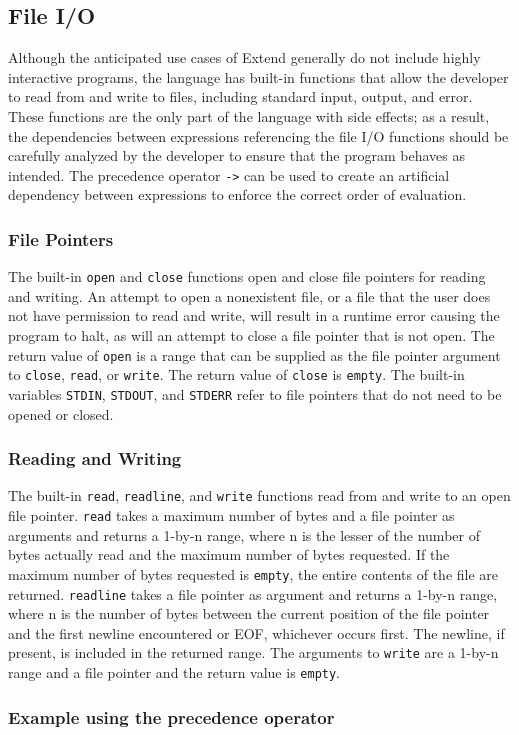 \subsection{File I/O}
\label{sec:IO}
Although the anticipated use cases of Extend generally do not include highly interactive programs, the language has built-in functions that allow the developer to read from and write to files, including standard input, output, and error. These functions are the only part of the language with side effects; as a result, the dependencies between expressions referencing the file I/O functions should be carefully analyzed by the developer to ensure that the program behaves as intended. The precedence operator \texttt{->} can be used to create an artificial dependency between expressions to enforce the correct order of evaluation.
\subsubsection{File Pointers}
The built-in \texttt{open} and \texttt{close} functions open and close file pointers for reading and writing. An attempt to open a nonexistent file, or a file that the user does not have permission to read and write, will result in a runtime error causing the program to halt, as will an attempt to close a file pointer that is not open. The return value of \texttt{open} is a range that can be supplied as the file pointer argument to \texttt{close}, \texttt{read}, or \texttt{write}. The return value of \texttt{close} is \texttt{empty}. The built-in variables \texttt{STDIN}, \texttt{STDOUT}, and \texttt{STDERR} refer to file pointers that do not need to be opened or closed.
\subsubsection{Reading and Writing}
The built-in \texttt{read}, \texttt{readline}, and \texttt{write} functions read from and write to an open file pointer.  \texttt{read} takes a maximum number of bytes and a file pointer as arguments and returns a 1-by-n range, where n is the lesser of the number of bytes actually read and the maximum number of bytes requested. If the maximum number of bytes requested is \texttt{empty}, the entire contents of the file are returned. \texttt{readline} takes a file pointer as argument and returns a 1-by-n range, where n is the number of bytes between the current position of the file pointer and the first newline encountered or EOF, whichever occurs first. The newline, if present, is included in the returned range. The arguments to \texttt{write} are a 1-by-n range and a file pointer and the return value is \texttt{empty}.
\subsubsection{Example using the precedence operator}

